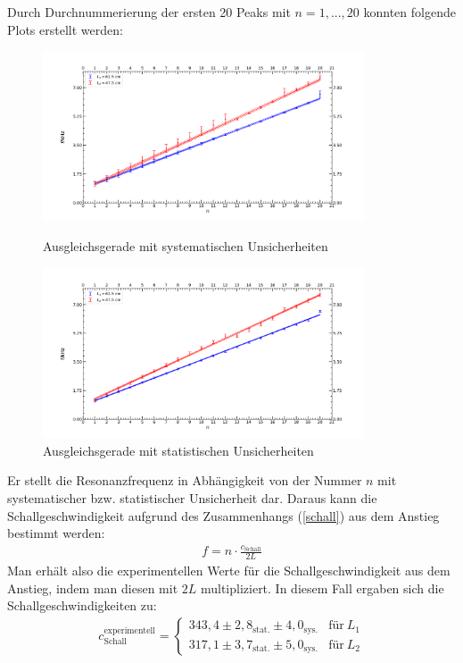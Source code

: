 \documentclass[german,  %
parskip=full,  %
]{scrartcl}
\begin{document}
Durch Durchnummerierung der ersten 20 Peaks mit $n=1,...,20$ konnten folgende Plots erstellt werden: 
\begin{figure}[h!]
\centering
\includegraphics[width=0.85\textwidth]{421_systematische_Unsicherheiten.png} %
\caption{Ausgleichsgerade mit systematischen Unsicherheiten}
\includegraphics[width=0.85\textwidth]{421_statistische_Unsicherheiten.png} %
\caption{Ausgleichsgerade mit statistischen Unsicherheiten}
\end{figure} 
\newpage
Er stellt die Resonanzfrequenz in Abhängigkeit von der Nummer $n$ mit systematischer bzw. statistischer Unsicherheit dar. Daraus kann die Schallgeschwindigkeit aufgrund des Zusammenhangs (\ref{schall}) aus dem Anstieg bestimmt werden:
\begin{align}
\label{schall} f = n \cdot\frac{c_{\mathrm{Schall}}}{2L}
\end{align}
Man erhält also die experimentellen Werte für die Schallgeschwindigkeit aus dem Anstieg, indem man diesen mit $2L$ multipliziert. In diesem Fall ergaben sich die Schallgeschwindigkeiten zu:
\begin{align}
c_{\mathrm{Schall}}^{\mathrm{experimentell}} =
  \begin{cases}
    343,4 \pm 2,8_{\mathrm{stat.}} \pm 4,0_{\mathrm{sys.}}  & \text{für} \ L_{1}  \\
	317,1 \pm 3,7_{\mathrm{stat.}} \pm 5,0_{\mathrm{sys.}} & \text{für} \ L_{2}
  \end{cases}
\end{align}
\end{document}
